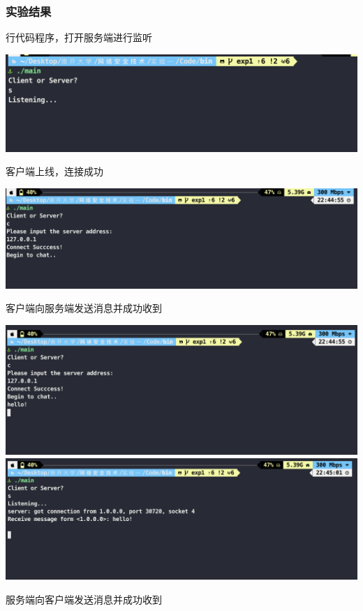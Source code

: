 \documentclass[UTF8,a4paper,10pt]{ctexart}
\begin{document}
\subsubsection{实验结果}
行代码程序，打开服务端进行监听
\begin{center}
  \includegraphics[scale = 0.5]{1}
\end{center}
客户端上线，连接成功
\begin{center}
  \includegraphics[scale = 0.5]{2}
\end{center}
客户端向服务端发送消息并成功收到
\begin{center}
  \includegraphics[scale = 0.5]{3}
  \includegraphics[scale = 0.5]{4}
\end{center}
服务端向客户端发送消息并成功收到
\end{document}
